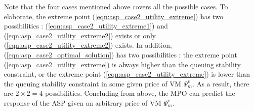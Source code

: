 \documentclass[10pt,journal, compsoc]{IEEEtran}
\begin{document}


Note that the four cases mentioned above covers all the possible cases. To elaborate, the extreme point (\ref{eqn:asp_case2_utility_extreme}) has two possibilities : (\ref{eqn:asp_case2_utility_extreme1}) and (\ref{eqn:asp_case2_utility_extreme2}) exists or only (\ref{eqn:asp_case2_utility_extreme2}) exists. In addition,  (\ref{eqn:asp_case2_optimal_solution}) has two possibilities : the extreme point (\ref{eqn:asp_case2_utility_extreme}) is always higher than the queuing stability constraint, or the extreme point (\ref{eqn:asp_case2_utility_extreme}) is lower than the queuing stability constraint in some given price of VM $\Psi_m^v$. As a result, there are $2 \times 2 = 4$ possibilities. Concluding from above, the MPO can predict the response of the ASP given an arbitrary price of VM $\Psi_m^v$.
\end{document}
